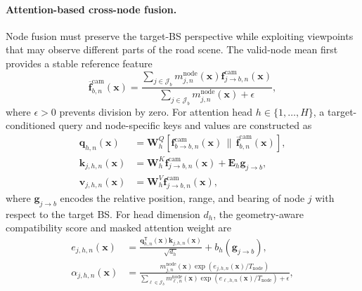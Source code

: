 \paragraph{Attention-based cross-node fusion.}
Node fusion must preserve the target-BS perspective while exploiting viewpoints
that may observe different parts of the road scene.  The valid-node mean first
provides a stable reference feature
\begin{equation}
    \overline{\mathbf{f}}^{\mathrm{cam}}_{b,n}(\mathbf{x})
    =
    \frac{
    \sum_{j\in\mathcal{J}_b}m^{\mathrm{node}}_{j,n}(\mathbf{x})
    \mathbf{f}^{\mathrm{cam}}_{j\rightarrow b,n}(\mathbf{x})}
    {\sum_{j\in\mathcal{J}_b}m^{\mathrm{node}}_{j,n}(\mathbf{x})+\epsilon},
    \label{eq:method-node-mean}
\end{equation}
where \(\epsilon>0\) prevents division by zero.  For attention head
\(h\in\{1,\ldots,H\}\), a target-conditioned query and node-specific keys and
values are constructed as
\begin{align}
    \mathbf{q}_{h,n}(\mathbf{x})
    &=\mathbf{W}^{Q}_{h}
    \left[
    \mathbf{f}^{\mathrm{cam}}_{b\rightarrow b,n}(\mathbf{x})
    \,\|\,
    \overline{\mathbf{f}}^{\mathrm{cam}}_{b,n}(\mathbf{x})
    \right],
    \label{eq:method-node-query}\\
    \mathbf{k}_{j,h,n}(\mathbf{x})
    &=\mathbf{W}^{K}_{h}
    \mathbf{f}^{\mathrm{cam}}_{j\rightarrow b,n}(\mathbf{x})
    +\mathbf{E}_{h}\mathbf{g}_{j\rightarrow b},
    \label{eq:method-node-key}\\
    \mathbf{v}_{j,h,n}(\mathbf{x})
    &=\mathbf{W}^{V}_{h}
    \mathbf{f}^{\mathrm{cam}}_{j\rightarrow b,n}(\mathbf{x}),
    \label{eq:method-node-value}
\end{align}
where \(\mathbf{g}_{j\rightarrow b}\) encodes the relative position, range, and
bearing of node \(j\) with respect to the target BS.  For head dimension
\(d_h\), the geometry-aware compatibility score and masked attention weight are
\begin{align}
    e_{j,h,n}(\mathbf{x})
    &=
    \frac{
    \mathbf{q}^{\mathsf T}_{h,n}(\mathbf{x})
    \mathbf{k}_{j,h,n}(\mathbf{x})}{\sqrt{d_h}}
    +b_h\!\left(\mathbf{g}_{j\rightarrow b}\right),
    \label{eq:method-node-attention-score}\\
    \alpha_{j,h,n}(\mathbf{x})
    &=
    \frac{
    m^{\mathrm{node}}_{j,n}(\mathbf{x})
    \exp\!\left(e_{j,h,n}(\mathbf{x})/T_{\mathrm{node}}\right)}
    {\sum_{\ell\in\mathcal{J}_b}
    m^{\mathrm{node}}_{\ell,n}(\mathbf{x})
    \exp\!\left(e_{\ell,h,n}(\mathbf{x})/T_{\mathrm{node}}\right)+\epsilon},
    \label{eq:method-node-attention-weight}
\end{align}
